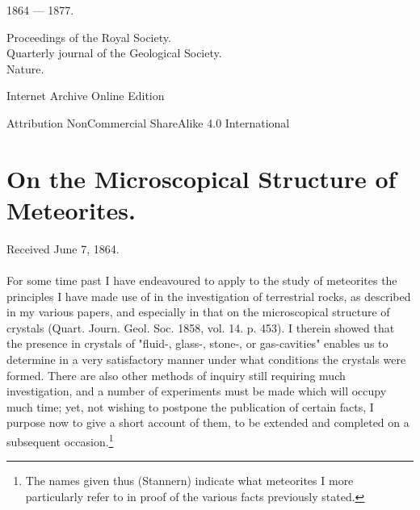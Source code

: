 \documentclass[a4paper, 12pt, oneside]{article}
\begin{document}
\begin{titlepage}
		
	\vspace*{\fill}%
	
	1864 --- 1877.%
	
	{\small Proceedings of the Royal Society. \\ Quarterly journal of the Geological Society. \\ Nature. } %

	\vspace{1\baselineskip} %

        Internet Archive Online Edition  %
	
	{\small Attribution NonCommercial ShareAlike 4.0 International } %
\end{titlepage}
\setlength{\parskip}{1mm plus1mm minus1mm}
\setcounter{tocdepth}{3}
\setcounter{secnumdepth}{3}
\tableofcontents
\clearpage
\section{On the Microscopical Structure of Meteorites.
}
\begin{center}
Received June 7, 1864.
\end{center}
\paragraph{}
For some time past I have endeavoured to apply to the study of meteorites the principles I have made use of in the investigation of terrestrial rocks, as described in my various papers, and especially in that on the microscopical structure of crystals (Quart. Journ. Geol. Soc. 1858, vol. 14. p. 453). I therein showed that the presence in crystals of "fluid-, glass-, stone-, or gas-cavities" enables us to determine in a very satisfactory manner under what conditions the crystals were formed. There are also other methods of inquiry still requiring much investigation, and a number of experiments must be made which will occupy much time; yet, not wishing to postpone the publication of certain facts, I purpose now to give a short account of them, to be extended and completed on a subsequent occasion.\footnote{The names given thus (Stannern) indicate what meteorites I more particularly refer to in proof of the various facts previously stated.}
\end{document}
